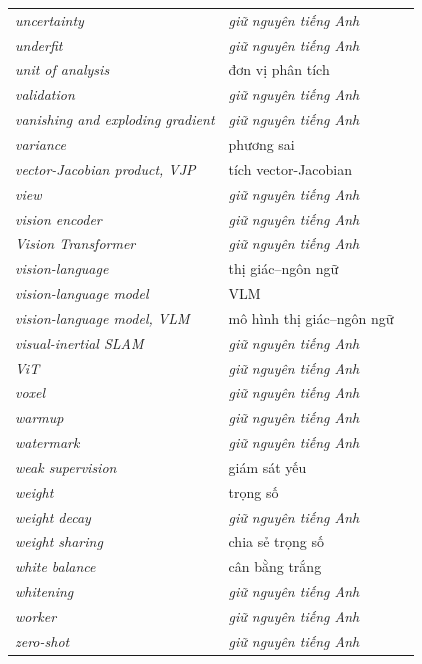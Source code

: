\documentclass[deep_learning.tex]{subfiles}
\begin{document}
\begin{longtable}{@{}L{5.2cm}L{5.9cm}L{2.6cm}@{}}
\emph{uncertainty} & \emph{\color{tiercol}giữ nguyên tiếng Anh} & \\
\emph{underfit} & \emph{\color{tiercol}giữ nguyên tiếng Anh} & \\
\emph{unit of analysis} & đơn vị phân tích & \\
\emph{validation} & \emph{\color{tiercol}giữ nguyên tiếng Anh} & \\
\emph{vanishing and exploding gradient} & \emph{\color{tiercol}giữ nguyên tiếng Anh} & \\
\emph{variance} & phương sai & \\
\emph{vector-Jacobian product, VJP} & tích vector-Jacobian & \\
\emph{view} & \emph{\color{tiercol}giữ nguyên tiếng Anh} & \\
\emph{vision encoder} & \emph{\color{tiercol}giữ nguyên tiếng Anh} & \\
\emph{Vision Transformer} & \emph{\color{tiercol}giữ nguyên tiếng Anh} & \\
\emph{vision-language} & thị giác--ngôn ngữ & \\
\emph{vision-language model} & VLM & \\
\emph{vision-language model, VLM} & mô hình thị giác--ngôn ngữ & \\
\emph{visual-inertial SLAM} & \emph{\color{tiercol}giữ nguyên tiếng Anh} & \\
\emph{ViT} & \emph{\color{tiercol}giữ nguyên tiếng Anh} & \\
\emph{voxel} & \emph{\color{tiercol}giữ nguyên tiếng Anh} & \\
\emph{warmup} & \emph{\color{tiercol}giữ nguyên tiếng Anh} & \\
\emph{watermark} & \emph{\color{tiercol}giữ nguyên tiếng Anh} & \\
\emph{weak supervision} & giám sát yếu & \\
\emph{weight} & trọng số & \\
\emph{weight decay} & \emph{\color{tiercol}giữ nguyên tiếng Anh} & \\
\emph{weight sharing} & chia sẻ trọng số & \\
\emph{white balance} & cân bằng trắng & \\
\emph{whitening} & \emph{\color{tiercol}giữ nguyên tiếng Anh} & \\
\emph{worker} & \emph{\color{tiercol}giữ nguyên tiếng Anh} & \\
\emph{zero-shot} & \emph{\color{tiercol}giữ nguyên tiếng Anh} & \\
\end{longtable}
\endgroup
\end{document}
